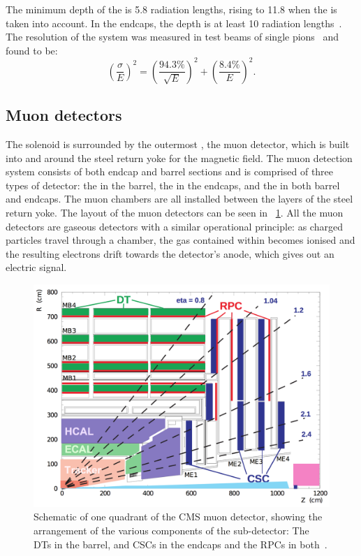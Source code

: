 The minimum depth of the \HB is 5.8 radiation lengths, rising to 11.8 when the \HO is taken into account. In the endcaps, the depth is at least 10 radiation lengths~\cite{cmsHcal}. The resolution of the \HCAL system was measured in test beams of single pions~\cite{Abdullin:2009zz} and found to be:
\begin{equation}
\label{eq:HCALresol}
\left( \frac{\sigma}{E}\right) ^2= \left( \frac{94.3\%}{\sqrt{E}} \right)^2 + \left( \frac{8.4\%}{E} \right)^2.
\end{equation}

\subsection{Muon detectors}
\label{sec:cms:muondetector}

The solenoid is surrounded by the outermost \subdetector, the muon detector, which is built into and around the steel return yoke for the magnetic field.
The \CMS muon detection system consists of both endcap and barrel sections and is comprised of three types of detector: the \DTs in the barrel, the \CSCs in the endcaps, and the \RPCs in both barrel and endcaps. The muon chambers are all installed between the layers of the steel return yoke. The layout of the muon detectors can be seen in \Fig~\ref{fig:muonssystem}. All the muon detectors are gaseous detectors with a similar operational principle: as charged particles travel through a chamber, the gas contained within becomes ionised and the resulting electrons drift towards the detector's anode, which gives out an electric signal. 
\begin{figure}[h]
\centering
\includegraphics[width=1.0\textwidth]{detectorFigures/cmsMuonSystem.png}
\caption[Schematic \crosssection of one quadrant of the CMS muon detector, showing the arrangement of the various components of the sub-detector: The DTs in the barrel, and CSCs in the endcaps and the RPCs in both\quad\cite{MuonReco}.]{Schematic \crosssection of one quadrant of the CMS muon detector, showing the arrangement of the various components of the sub-detector: The DTs in the barrel, and CSCs in the endcaps and the RPCs in both~\cite{MuonReco}.}
\label{fig:muonssystem}
\end{figure}

